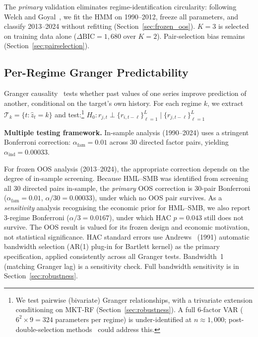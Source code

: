 \documentclass[sigconf,anonymous]{acmart}
\begin{document}
The \emph{primary} validation eliminates regime-identification circularity:
following Welch and Goyal~\cite{welch2008comprehensive}, we fit the HMM on
1990--2012, freeze all parameters, and classify 2013--2024 without refitting
(Section~\ref{sec:frozen_oos}). $K{=}3$ is selected on training data alone
($\Delta\text{BIC} = 1{,}680$ over $K{=}2$). Pair-selection bias remains
(Section~\ref{sec:pairselection}).

\subsection{Per-Regime Granger Predictability}
\label{sec:granger_method}

Granger causality~\cite{granger1969investigating,shojaie2022granger} tests whether past values
of one series improve prediction of another, conditional on the target's own history.
For each regime $k$, we extract $\mathcal{T}_k = \{t : \hat{z}_t = k\}$
and test:\footnote{We test pairwise (bivariate) Granger relationships, with a
trivariate extension conditioning on MKT-RF (Section~\ref{sec:robustness}).
A full 6-factor VAR ($6^2 \times 9 = 324$ parameters per regime) is
under-identified at $n \approx 1{,}000$; post-double-selection
methods~\cite{hecq2023granger} could address this.}
$H_0: r_{j,t} \perp \{r_{i,t-\ell}\}_{\ell=1}^{L} \mid \{r_{j,t-\ell}\}_{\ell=1}^{L}$

\textbf{Multiple testing framework.}
In-sample analysis (1990--2024) uses a stringent Bonferroni correction:
$\alpha_{\text{fam}} = 0.01$ across 30 directed factor pairs, yielding
$\alpha_{\text{ind}} = 0.00033$. 

For frozen OOS analysis (2013--2024), the appropriate correction depends on the
degree of in-sample screening. Because HML--SMB was identified from screening
all 30 directed pairs in-sample, the \emph{primary} OOS correction is
30-pair Bonferroni ($\alpha_{\text{fam}} = 0.01$, $\alpha/30 = 0.00033$), under
which no OOS pair survives. As a \emph{sensitivity} analysis recognising
the economic prior for HML--SMB, we also report 3-regime Bonferroni
($\alpha/3 = 0.0167$), under which HAC $p = 0.043$ still does not survive.
The OOS result is valued for its frozen
design and economic motivation, not statistical significance.
HAC standard errors use Andrews~\cite{andrews1991heteroskedasticity}
(1991) automatic bandwidth selection (AR(1) plug-in for Bartlett kernel) as the primary specification,
applied consistently across all Granger tests. Bandwidth~1 (matching Granger lag) is a sensitivity check. Full bandwidth sensitivity is in
Section~\ref{sec:robustness}.
\end{document}
